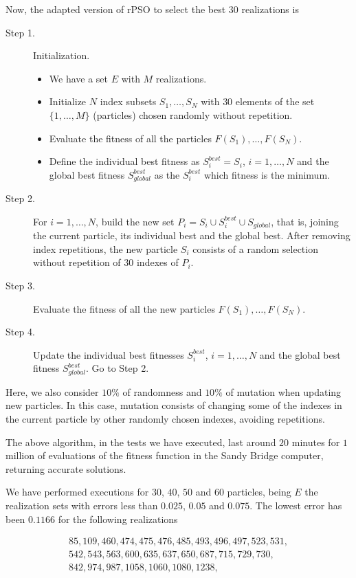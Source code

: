 Now, the adapted version of rPSO to select the best $30$ realizations is

\begin{description}
	\item[Step 1.] Initialization.
	\begin{itemize}
		\item We have a set $E$ with $M$ realizations.
		\item Initialize $N$ index subsets $S_1,\ldots,S_N$ with $30$ elements of the set $\{1,\ldots,M\}$ (particles) chosen randomly without repetition.
		\item Evaluate the fitness of all the particles $F(S_1), \ldots, F(S_N)$.
		\item Define the individual best fitness as $S_i^{best} = S_i$, $i=1,\ldots,N$ and the global best fitness $S_{global}^{best}$ as the $S_i^{best}$ which fitness is the minimum.
	\end{itemize}
	\item[Step 2.] For $i=1,\ldots,N$, build the new set $P_i=S_i \cup S_i^{best} \cup S_{global}$, that is, joining the current particle, its individual best and the global best. After removing index repetitions, the new particle $S_i$ consists of a random selection without repetition of $30$ indexes of $P_i$.
	\item[Step 3.] Evaluate the fitness of all the new particles $F(S_1), \ldots, F(S_N)$.	
	\item[Step 4.] Update the individual best fitnesses $S_i^{best}$, $i=1,\ldots,N$ and  the global best fitness $S_{global}^{best}$. Go to Step 2. 
\end{description}

Here, we also consider $10\%$ of randomness and $10\%$ of mutation when updating new particles. In this case, mutation consists of changing some of the indexes in the current particle by other randomly chosen indexes, avoiding repetitions.

The above algorithm, in the tests we have executed, last around $20$ minutes for $1$ million of evaluations of the fitness function in the Sandy Bridge computer, returning accurate solutions.

We have performed executions for $30$, $40$, $50$ and $60$ particles, being $E$ the realization sets with errors less than $0.025$, $0.05$ and $0.075$. The lowest error has been $0.1166$ for the following realizations  

\begin{equation}
\begin{array}{c}
85, 109, 460, 474, 475, 476, 485, 493, 496, 497, 523, 531, \\
542, 543, 563, 600, 635, 637, 650, 687, 715, 729, 730, \\
842, 974, 987, 1058, 1060, 1080, 1238,	
\end{array}
\label{laselegidas}    
\end{equation}

